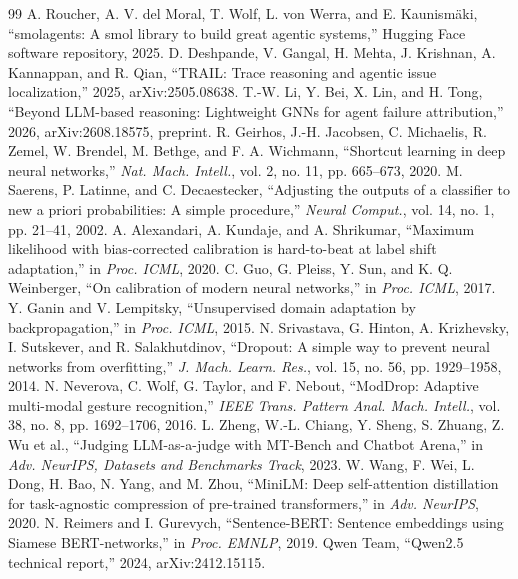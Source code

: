 \documentclass[conference]{IEEEtran}
\begin{document}
\begin{thebibliography}{99}
 A. Roucher, A. V. del Moral, T. Wolf, L. von Werra, and E. Kaunism\"aki, ``smolagents: A smol library to build great agentic systems,'' Hugging Face software repository, 2025.
 D. Deshpande, V. Gangal, H. Mehta, J. Krishnan, A. Kannappan, and R. Qian, ``TRAIL: Trace reasoning and agentic issue localization,'' 2025, arXiv:2505.08638.
 T.-W. Li, Y. Bei, X. Lin, and H. Tong, ``Beyond LLM-based reasoning: Lightweight GNNs for agent failure attribution,'' 2026, arXiv:2608.18575, preprint.
 R. Geirhos, J.-H. Jacobsen, C. Michaelis, R. Zemel, W. Brendel, M. Bethge, and F. A. Wichmann, ``Shortcut learning in deep neural networks,'' \emph{Nat. Mach. Intell.}, vol. 2, no. 11, pp. 665--673, 2020.
 M. Saerens, P. Latinne, and C. Decaestecker, ``Adjusting the outputs of a classifier to new a priori probabilities: A simple procedure,'' \emph{Neural Comput.}, vol. 14, no. 1, pp. 21--41, 2002.
 A. Alexandari, A. Kundaje, and A. Shrikumar, ``Maximum likelihood with bias-corrected calibration is hard-to-beat at label shift adaptation,'' in \emph{Proc. ICML}, 2020.
 C. Guo, G. Pleiss, Y. Sun, and K. Q. Weinberger, ``On calibration of modern neural networks,'' in \emph{Proc. ICML}, 2017.
 Y. Ganin and V. Lempitsky, ``Unsupervised domain adaptation by backpropagation,'' in \emph{Proc. ICML}, 2015.
 N. Srivastava, G. Hinton, A. Krizhevsky, I. Sutskever, and R. Salakhutdinov, ``Dropout: A simple way to prevent neural networks from overfitting,'' \emph{J. Mach. Learn. Res.}, vol. 15, no. 56, pp. 1929--1958, 2014.
 N. Neverova, C. Wolf, G. Taylor, and F. Nebout, ``ModDrop: Adaptive multi-modal gesture recognition,'' \emph{IEEE Trans. Pattern Anal. Mach. Intell.}, vol. 38, no. 8, pp. 1692--1706, 2016.
 L. Zheng, W.-L. Chiang, Y. Sheng, S. Zhuang, Z. Wu et al., ``Judging LLM-as-a-judge with MT-Bench and Chatbot Arena,'' in \emph{Adv. NeurIPS, Datasets and Benchmarks Track}, 2023.
 W. Wang, F. Wei, L. Dong, H. Bao, N. Yang, and M. Zhou, ``MiniLM: Deep self-attention distillation for task-agnostic compression of pre-trained transformers,'' in \emph{Adv. NeurIPS}, 2020.
 N. Reimers and I. Gurevych, ``Sentence-BERT: Sentence embeddings using Siamese BERT-networks,'' in \emph{Proc. EMNLP}, 2019.
 Qwen Team, ``Qwen2.5 technical report,'' 2024, arXiv:2412.15115.
\end{thebibliography}
\end{document}
